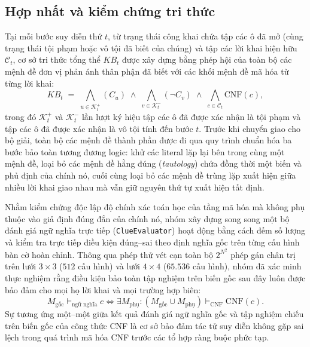 \subsection{Hợp nhất và kiểm chứng tri thức}
\label{subsec:kb_assembly}
Tại mỗi bước suy diễn thứ $t$, từ trạng thái công khai chứa tập các ô đã mở (cùng
trạng thái tội phạm hoặc vô tội đã biết của chúng) và tập các lời khai hiện hữu
$\mathcal{C}_t$, cơ sở tri thức tổng thể $KB_t$ được xây dựng bằng phép hội của
toàn bộ các mệnh đề đơn vị phản ánh thân phận đã biết với các khối mệnh đề mã hóa
từ từng lời khai:
\begin{equation}
    KB_t \;=\; \bigwedge_{u \in \mathcal{K}_t^{+}} (C_u)
    \;\wedge\; \bigwedge_{v \in \mathcal{K}_t^{-}} (\neg C_v)
    \;\wedge\; \bigwedge_{c \in \mathcal{C}_t} \text{CNF}(c),
    \label{eq:kb_total}
\end{equation}
trong đó $\mathcal{K}_t^{+}$ và $\mathcal{K}_t^{-}$ lần lượt ký hiệu tập các ô đã
được xác nhận là tội phạm và tập các ô đã được xác nhận là vô tội tính đến bước
$t$. Trước khi chuyển giao cho bộ giải, toàn bộ các mệnh đề thành phần được đi qua
quy trình chuẩn hóa ba bước bảo toàn tương đương logic: khử các literal lặp lại
bên trong cùng một mệnh đề, loại bỏ các mệnh đề hằng đúng (\textit{tautology}) chứa
đồng thời một biến và phủ định của chính nó, cuối cùng loại bỏ các mệnh đề trùng
lặp xuất hiện giữa nhiều lời khai giao nhau mà vẫn giữ nguyên thứ tự xuất hiện tất
định.

Nhằm kiểm chứng độc lập độ chính xác toán học của tầng mã hóa mà không phụ thuộc
vào giả định đúng đắn của chính nó, nhóm xây dựng song song một bộ đánh giá ngữ
nghĩa trực tiếp (\texttt{ClueEvaluator}) hoạt động bằng cách đếm số lượng và kiểm
tra trực tiếp điều kiện đúng--sai theo định nghĩa gốc trên từng cấu hình bàn cờ
hoàn chỉnh. Thông qua phép thử vét cạn toàn bộ $2^{N^2}$ phép gán chân trị trên
lưới $3 \times 3$ ($512$ cấu hình) và lưới $4 \times 4$ ($65.536$ cấu hình), nhóm
đã xác minh thực nghiệm rằng điều kiện bảo toàn tập nghiệm trên biến gốc sau đây
luôn được bảo đảm cho mọi họ lời khai và mọi trường hợp biên:
\begin{equation}
    M_{\text{gốc}} \models_{\text{ngữ nghĩa}} c
    \iff \exists M_{\text{phụ}} :
    (M_{\text{gốc}} \cup M_{\text{phụ}}) \models_{\text{CNF}} \text{CNF}(c).
\end{equation}
Sự tương ứng một--một giữa kết quả đánh giá ngữ nghĩa gốc và tập nghiệm chiếu trên
biến gốc của công thức CNF là cơ sở bảo đảm tác tử suy diễn không gặp sai lệch
trong quá trình mã hóa CNF trước các tổ hợp ràng buộc phức tạp.
